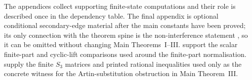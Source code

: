 The appendices collect supporting finite-state computations and their role is
described once in the dependency table.  The final appendix is optional
conditional secondary-edge material after the main constants have been proved;
its only connection with the theorem spine is the non-interference statement
, so it can be omitted without
changing Main Theorems~I--III.
support the scalar finite-part and cyclic-lift comparisons used around the
finite-part normalisation.   supply the finite \(S_3\) matrices and printed
rational inequalities used only as the concrete witness for the
Artin-substitution obstruction in Main Theorem~III.



